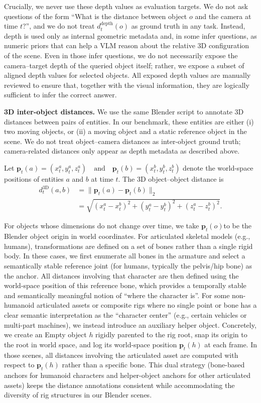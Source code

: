 Crucially, we never use these depth values as evaluation targets. We do not ask questions of the form “What is the distance between object \(o\) and the camera at time \(t\)?”, and we do not treat \(d^{\text{depth}}_t(o)\) as ground truth in any task. Instead, depth is used only as internal geometric metadata and, in some infer questions, as numeric priors that can help a VLM reason about the relative 3D configuration of the scene. Even in those infer questions, we do not necessarily expose the camera--target depth of the queried object itself; rather, we expose a subset of aligned depth values for selected objects. All exposed depth values are manually reviewed to ensure that, together with the visual information, they are logically sufficient to infer the correct answer.

\noindent\textbf{3D inter-object distances.}
We use the same Blender script to annotate 3D distances between pairs of entities. In our benchmark, these entities are either
(i) two moving objects, or
(ii) a moving object and a static reference object in the scene.
We do not treat object--camera distances as inter-object ground truth; camera-related distances only appear as depth metadata as described above.

Let $\mathbf{p}_t(a) = (x_t^a, y_t^a, z_t^a)
\quad\text{and}\quad
\mathbf{p}_t(b) = (x_t^b, y_t^b, z_t^b)$ denote the world-space positions of entities \(a\) and \(b\) at time \(t\). The 3D object--object distance is
\[
\begin{aligned}
d^{3\text{D}}_t(a,b)
&= \bigl\lVert \mathbf{p}_t(a) - \mathbf{p}_t(b) \bigr\rVert_2 \\
&= \sqrt{(x_t^a - x_t^b)^2 + (y_t^a - y_t^b)^2 + (z_t^a - z_t^b)^2}.
\end{aligned}
\]


For objects whose dimensions do not change over time, we take \(\mathbf{p}_t(o)\)to be the Blender object origin in world coordinates. For articulated skeletal models (e.g., humans), transformations are defined on a set of bones rather than a single rigid body. In these cases, we first enumerate all bones in the armature and select a semantically stable reference joint (for humans, typically the pelvis/hip bone) as the anchor. All distances involving that character are then defined using the world-space position of this reference bone, which provides a temporally stable and semantically meaningful notion of “where the character is”. For some non-humanoid articulated assets or composite rigs where no single point or bone has a clear semantic interpretation as the “character center” (e.g., certain vehicles or multi-part machines), we instead introduce an auxiliary helper object. Concretely, we create an Empty object \(h\) rigidly parented to the rig root, snap its origin to the root in world space, and log its world-space position \(\mathbf{p}_t(h)\) at each frame. In those scenes, all distances involving the articulated asset are computed with respect to \(\mathbf{p}_t(h)\) rather than a specific bone. This dual strategy (bone-based anchors for humanoid characters and helper-object anchors for other articulated assets) keeps the distance annotations consistent while accommodating the diversity of rig structures in our Blender scenes.

